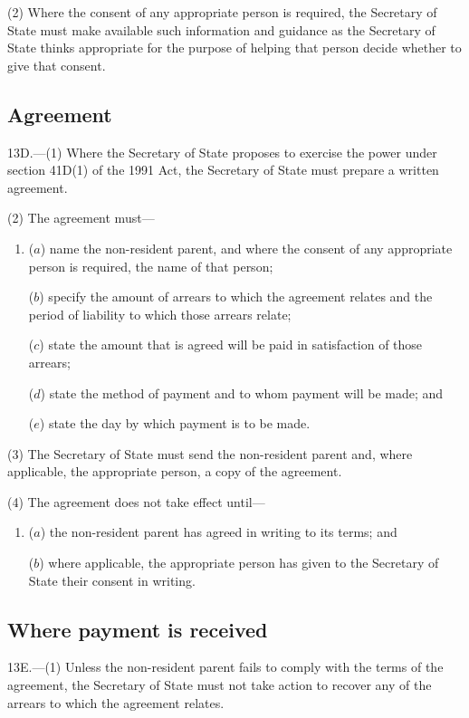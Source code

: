 \documentclass[12pt,a4paper]{article}
\begin{document}
(2) Where the consent of any appropriate person is required, the Secretary of State must make available such information and guidance as the Secretary of State thinks appropriate for the purpose of helping that person decide whether to give that consent.

\subsection[13D. Agreement]{Agreement}

13D.---(1)  Where the Secretary of State proposes to exercise the power under section 41D(1) of the 1991 Act, the Secretary of State must prepare a written agreement.

(2) The agreement must—
\begin{enumerate}\item[]
($a$) name the non-resident parent, and where the consent of any appropriate person is required, the name of that person;

($b$) specify the amount of arrears to which the agreement relates and the period of liability to which those arrears relate;

($c$) state the amount that is agreed will be paid in satisfaction of those arrears;

($d$) state the method of payment and to whom payment will be made; and

($e$) state the day by which payment is to be made.
\end{enumerate}

(3) The Secretary of State must send the non-resident parent and, where applicable, the appropriate person, a copy of the agreement.

(4) The agreement does not take effect until—
\begin{enumerate}\item[]
($a$) the non-resident parent has agreed in writing to its terms; and

($b$) where applicable, the appropriate person has given to the Secretary of State their consent in writing.
\end{enumerate}

\subsection[13E. Where payment is received]{Where payment is received}

13E.---(1)  Unless the non-resident parent fails to comply with the terms of the agreement, the Secretary of State must not take action to recover any of the arrears to which the agreement relates.
\end{document}
